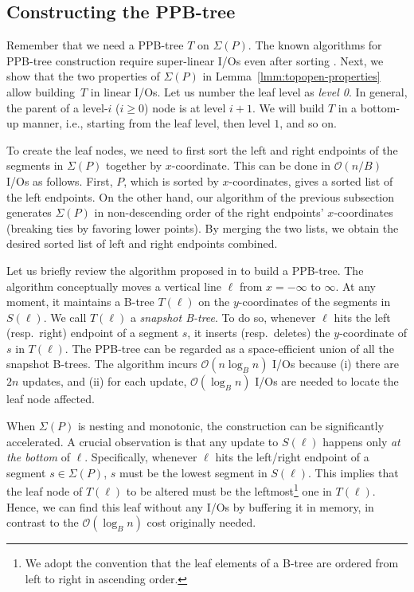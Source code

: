 \documentclass{sig-alternate}
\def\extraspacing{\vspace{2mm} \noindent}
\newcommand{\bigO}{\mathcal{O}}
\renewcommand{\(}{\left(}
\renewcommand{\)}{\right)}
\begin{document}
\subsection{Constructing the PPB-tree} \label{sec:topopen-pers}


Remember that we need a PPB-tree $T$ on $\Sigma(P)$. The known algorithms for
PPB-tree construction require super-linear I/Os even after sorting \cite{A03,
BGOSW96, BSW97, V08}. Next, we show that the two properties of $\Sigma(P)$ in
Lemma~\ref{lmm:topopen-properties} allow building~$T$ in linear I/Os. Let us
number the leaf level as {\em level 0}. In general, the parent of a level-$i$
($i \ge 0$) node is at level $i+1$. We will build $T$ in a bottom-up manner,
i.e., starting from the leaf level, then level $1$, and so on.

\extraspacing{\bf Leaf Level.} To create the leaf nodes, we need to first sort
the left and right endpoints of the segments in $\Sigma(P)$ together by
$x$-coordinate. This can be done in $\bigO(n/B)$ I/Os as follows. First, $P$,
which is sorted by $x$-coordinates, gives a sorted list of the left endpoints.
On the other hand, our algorithm of the previous subsection generates
$\Sigma(P)$ in non-descending order of the right endpoints' $x$-coordinates
(breaking ties by favoring lower points). By merging the two lists, we obtain
the desired sorted list of left and right endpoints combined.

Let us briefly review the algorithm proposed in \cite{BGOSW96} to build a
PPB-tree. The algorithm conceptually moves a vertical line $\ell$ from $x =
-\infty$ to $\infty$. At any moment, it maintains a B-tree $T(\ell)$ on the
$y$-coordinates of the segments in $S(\ell)$. We call $T(\ell)$ a {\em
snapshot B-tree}. To do so, whenever $\ell$ hits the left (resp.\ right) endpoint of a
segment $s$, it inserts (resp.\ deletes) the $y$-coordinate of $s$ in $T(\ell)$. The
PPB-tree can be regarded as a space-efficient union of all the snapshot
B-trees. The algorithm incurs $\bigO(n \log_B n)$ I/Os because (i) there are
$2n$ updates, and (ii) for each update, $\bigO(\log_B n)$ I/Os are needed to
locate the leaf node affected.

When $\Sigma(P)$ is nesting and monotonic, the construction
can be significantly accelerated. A crucial observation is that any update to
$S(\ell)$ happens only {\em at the bottom} of $\ell$. Specifically, whenever
$\ell$ hits the left/right endpoint of a segment $s \in \Sigma(P)$, $s$ must be
the lowest segment in $S(\ell)$. This implies that the leaf node of $T(\ell)$
to be altered must be the leftmost\footnote{We adopt the convention that the leaf elements of a B-tree are ordered from left to right in ascending order.} one in $T(\ell)$. Hence, we can find this leaf
without any I/Os by buffering it in memory, in contrast to the $\bigO(\log_B n)$
cost originally needed.
\end{document}
